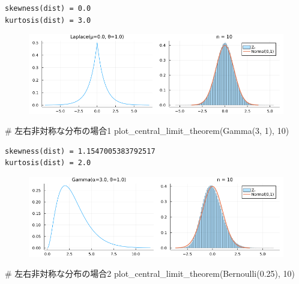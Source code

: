 \documentclass[
  letterpaper,
  DIV=11,
  numbers=noendperiod]{scrartcl}
\newenvironment{Shaded}{\begin{snugshade}}{\end{snugshade}}
\newcommand{\CommentTok}[1]{\textcolor[rgb]{0.37,0.37,0.37}{#1}}
\newcommand{\FloatTok}[1]{\textcolor[rgb]{0.68,0.00,0.00}{#1}}
\newcommand{\FunctionTok}[1]{\textcolor[rgb]{0.28,0.35,0.67}{#1}}
\newcommand{\NormalTok}[1]{\textcolor[rgb]{0.00,0.23,0.31}{#1}}
\begin{document}
\begin{verbatim}
skewness(dist) = 0.0
kurtosis(dist) = 3.0
\end{verbatim}

\begin{figure}[H]

{\centering \includegraphics{05 Central limit theorem_files/figure-pdf/cell-77-output-2.png}

}

\end{figure}

\begin{Shaded}
\begin{Highlighting}[]
\CommentTok{\# 左右非対称な分布の場合1}
\FunctionTok{plot\_central\_limit\_theorem}\NormalTok{(}\FunctionTok{Gamma}\NormalTok{(}\FloatTok{3}\NormalTok{, }\FloatTok{1}\NormalTok{), }\FloatTok{10}\NormalTok{)}
\end{Highlighting}
\end{Shaded}

\begin{verbatim}
skewness(dist) = 1.1547005383792517
kurtosis(dist) = 2.0
\end{verbatim}

\begin{figure}[H]

{\centering \includegraphics{05 Central limit theorem_files/figure-pdf/cell-78-output-2.png}

}

\end{figure}

\begin{Shaded}
\begin{Highlighting}[]
\CommentTok{\# 左右非対称な分布の場合2}
\FunctionTok{plot\_central\_limit\_theorem}\NormalTok{(}\FunctionTok{Bernoulli}\NormalTok{(}\FloatTok{0.25}\NormalTok{), }\FloatTok{10}\NormalTok{)}
\end{Highlighting}
\end{Shaded}
\end{document}
